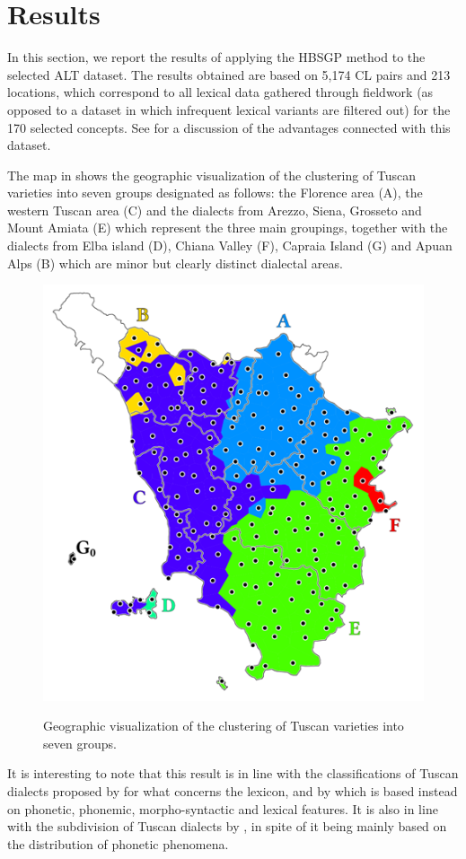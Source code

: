 \documentclass[output=paper]{LSP/langsci}
\begin{document}
\section{Results}
In this section, we report the results of applying the HBSGP method to the selected ALT dataset. The results obtained are based on 5,174 CL pairs and 213 locations, which correspond to all lexical data gathered through fieldwork (as opposed to a dataset in which infrequent lexical variants are filtered out) for the 170 selected concepts. See \citet{wieling_infrequent_2015} for a discussion of the advantages connected with this dataset. 

The map in  shows the geographic visualization of the clustering of Tuscan varieties into seven groups designated as follows: the Florence area (A), the western Tuscan area (C) and the dialects from Arezzo, Siena, Grosseto and Mount Amiata (E) which represent the three main groupings, together with the dialects from Elba island (D), Chiana Valley (F), Capraia Island (G) and Apuan Alps (B) which are minor but clearly distinct dialectal areas.

\begin{figure}
\includegraphics[width=.7\textwidth]{illustrations/monte_wiel_fig1} 
\label{fig:1}
\caption{Geographic visualization of the clustering of Tuscan varieties into seven groups.} 
\end{figure}

It is interesting to note that this result is in line with the classifications of Tuscan dialects proposed by \citet{giacomelli_aree_1975} for what concerns the lexicon, and by \citet{giannelli_toscana_1976} which is based instead on phonetic, phonemic, morpho-syntactic and lexical features. It is also in line with the subdivision of Tuscan dialects by \citet{pellegrini_carta_1977}, in spite of it being mainly based on the distribution of phonetic phenomena.
\end{document}
